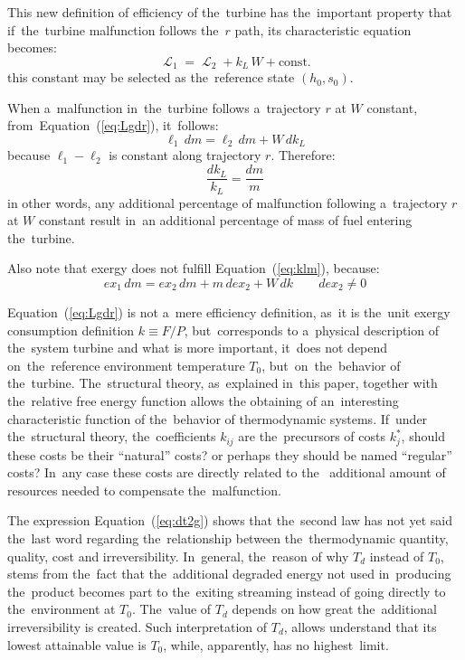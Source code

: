 \documentclass[energies,article,accept,moreauthors,pdftex]{Definitions/mdpi}
\DeclareMathOperator{\Lgdr}{\mathcal{L}}
\begin{document}
This new definition of efficiency of the~turbine has the~important property that if~the~turbine malfunction follows the~$r$ path, its characteristic equation becomes:
\begin{equation}
\Lgdr_1=\Lgdr_2 + k_L\,W + \text{const}.
\label{eq:Lgdr}
\end{equation}
this constant may be selected as the~reference state $(h_0,s_0)$.

When a~malfunction in~the~turbine follows a~trajectory $r$ at $W$ constant, from~Equation~(\ref{eq:Lgdr}), it~follows:
\begin{equation}
    \ell_1\, dm = \ell_2\, dm + W\,dk_L
\end{equation}
because $\ell_1-\ell_2$ is constant along trajectory $r$. Therefore:
\begin{equation}
    \frac{dk_L}{k_L}=\frac{dm}{m}
    \label{eq:klm}
\end{equation}
in other words, any additional percentage of malfunction following a~trajectory $r$ at $W$ constant result in~an additional percentage of mass of fuel entering the~turbine.

Also note that exergy does not fulfill Equation~(\ref{eq:klm}), because:
\[
	ex_1\,dm = ex_2\,dm + m\,dex_2 + W\,dk\qquad dex_2\neq0
\]

Equation~(\ref{eq:Lgdr}) is not a~mere efficiency definition, as~it is the~unit exergy consumption definition $k\equiv F/P$, but~corresponds to a~physical description of the~system turbine and what is more important, it~does not depend on~the~reference environment temperature $T_0$, but~on~the~behavior of the~turbine. The~structural theory, as~explained in~this paper, together with the~relative free energy function allows the obtaining of an~interesting characteristic function of the~behavior of thermodynamic systems. If~under the~structural theory, the~coefficients $k_{ij}$ are the~precursors of costs $k_j^*$, should these costs be their “natural” costs? or perhaps they should be named “regular” costs? In~any case these costs are directly related to the~ additional amount of resources needed to compensate the~malfunction.

The expression Equation~(\ref{eq:dt2g}) shows that the~second law has not yet said the~last word regarding the~relationship between the~thermodynamic quantity, quality, cost and irreversibility. In~general, the~reason of why $T_d$ instead of $T_0$, stems from the~fact that the~additional degraded energy not used in~producing the~product becomes part to the~exiting streaming instead of going directly to the~environment at $T_0$.  The~value of $T_d$ depends on how great the~additional irreversibility is created. Such interpretation of $T_d$, allows understand that its lowest attainable value is $T_0$, while, apparently, has no highest~limit.
\end{document}
